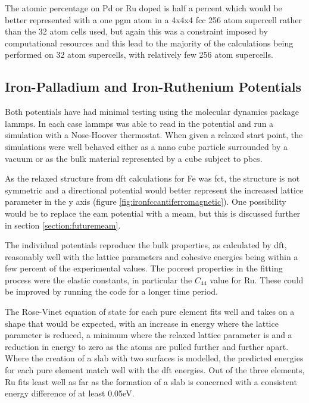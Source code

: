 The atomic percentage on Pd or Ru doped is half a percent which would be better represented with a one \acrshort{pgm} atom in a 4x4x4 \acrshort{fcc} 256 atom supercell rather than the 32 atom cells used, but again this was a constraint imposed by computational resources and this lead to the majority of the calculations being performed on 32 atom supercells, with relatively few 256 atom supercells.


\subsection{Iron-Palladium and Iron-Ruthenium Potentials}

Both potentials have had minimal testing using the molecular dynamics package \acrshort{lammps}.  In each case \acrshort{lammps} was able to read in the potential and run a simulation with a Nose-Hoover thermostat.  When given a relaxed start point, the simulations were well behaved either as a nano cube particle surrounded by a vacuum or as the bulk material represented by a cube subject to \acrshort{pbc}s.

As the relaxed structure from \acrshort{dft} calculations for Fe was \acrshort{fct}, the structure is not symmetric and a directional potential would better represent the increased lattice parameter in the y axis (figure \ref{fig:ironfccantiferromagnetic}).  One possibility would be to replace the \acrshort{eam} potential with a \acrshort{meam}, but this is discussed further in section \ref{section:futuremeam}.

The individual potentials reproduce the bulk properties, as calculated by \acrshort{dft}, reasonably well with the lattice parameters and cohesive energies being within a few percent of the experimental values.  The poorest properties in the fitting process were the elastic constants, in particular the $C_{44}$ value for \Gls{Ru}.  These could be improved by running the code for a longer time period.

The Rose-Vinet equation of state for each pure element fits well and takes on a shape that would be expected, with an increase in energy where the lattice parameter is reduced, a minimum where the relaxed lattice parameter is and a reduction in energy to zero as the atoms are pulled further and further apart.  Where the creation of a slab with two surfaces is modelled, the predicted energies for each pure element match well with the \acrshort{dft} energies.  Out of the three elements, Ru fits least well as far as the formation of a slab is concerned with a consistent energy difference of at least 0.05eV.

